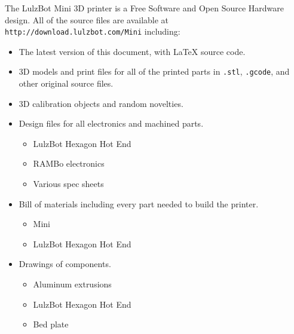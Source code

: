 %
%
%
%
%

The LulzBot Mini 3D printer is a Free Software and Open Source Hardware design. All of the source files are available at \texttt{http://download.lulzbot.com/Mini} including:

\begin{itemize}
\item The latest version of this document, with {\LaTeX} source code.

\item 3D models and print files for all of the printed parts in \texttt{.stl}, \texttt{.gcode}, and other original source files.

\item 3D calibration objects and random novelties.

\item Design files for all electronics and machined parts.

\begin{itemize} %
\item LulzBot Hexagon Hot End
\item RAMBo electronics
\item Various spec sheets
\end{itemize} %

\item Bill of materials including every part needed to build the printer.
\begin{itemize} %
\item Mini
\item LulzBot Hexagon Hot End
\end{itemize} %

\item Drawings of components.
\begin{itemize} %
\item Aluminum extrusions
\item LulzBot Hexagon Hot End
\item Bed plate
\end{itemize} %


\end{itemize}

